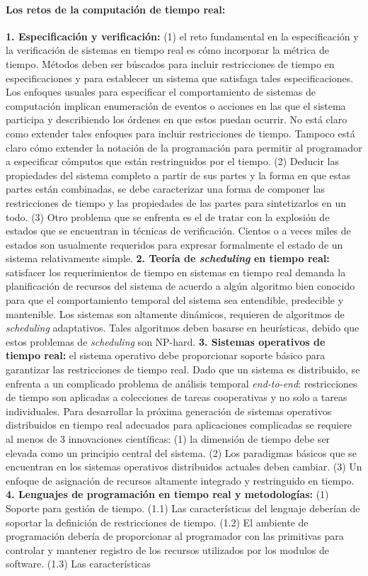 \paragraph{\textnormal{\textbf{Los retos de la computación de tiempo real:}}} \textbf{1. Especificación y verificación:} (1) el reto fundamental en la especificación y la verificación de sistemas en tiempo real es cómo incorporar la métrica de tiempo. Métodos deben ser búscados para incluir restricciones de tiempo en especificaciones y para establecer un sistema que satisfaga tales especificaciones. Los enfoques usuales para especificar el comportamiento de sistemas de computación implican enumeración de eventos o acciones en las que el sistema participa y describiendo los órdenes en que estos puedan ocurrir. No está claro como extender tales enfoques  para incluir restricciones de tiempo. Tampoco está claro cómo extender la notación de la programación para permitir al programador a especificar cómputos que están restringuidos por el tiempo. (2) Deducir las propiedades del sistema completo a partir de sus partes y la forma en que estas partes están combinadas, se debe caracterizar una forma de componer las restricciones de tiempo y las propiedades de las partes para sintetizarlos en un todo. (3) Otro problema que se enfrenta es el de tratar con la explosión de estados que se encuentran in técnicas de verificación. Cientos o a veces miles de estados son usualmente requeridos para expresar formalmente el estado de un sistema relativamente simple. \textbf{2. Teoría de \emph{scheduling} en tiempo real:} satisfacer los requerimientos de tiempo en sistemas en tiempo real demanda la planificación de recursos del sistema de acuerdo a algún algoritmo bien conocido para que el comportamiento temporal del sistema sea entendible, predecible y mantenible. Los sistemas son altamente dinámicos, requieren de algoritmos de \emph{scheduling} adaptativos. Tales algoritmos deben basarse en heurísticas, debido que estos problemas de \emph{scheduling} son NP-hard. \textbf{3. Sistemas operativos de tiempo real:} el sistema operativo debe proporcionar soporte básico para garantizar las restricciones de tiempo real. Dado que un sistema es distribuido, se enfrenta a un complicado problema de análisis temporal \emph{end-to-end}: restricciones de tiempo son aplicadas a colecciones de tareas cooperativas y no solo a tareas individuales. Para desarrollar la próxima generación de sistemas operativos distribuidos en tiempo real adecuados para aplicaciones complicadas se requiere al menos de 3 innovaciones científicas: (1) la dimensión de tiempo debe ser elevada como un principio central del sistema. (2) Los paradigmas básicos que se encuentran en los sistemas operativos distribuidos actuales deben cambiar. (3) Un enfoque de asignación de recursos altamente integrado y restringuido en tiempo. \textbf{4. Lenguajes de programación en tiempo real y metodologías:} (1) Soporte para gestión de tiempo. (1.1) Las características del lenguaje deberían de soportar la definición de restricciones de tiempo. (1.2) El ambiente de programación debería de proporcionar al programador con las primitivas para controlar y mantener registro de los recursos utilizados por los modulos de software. (1.3) Las características 